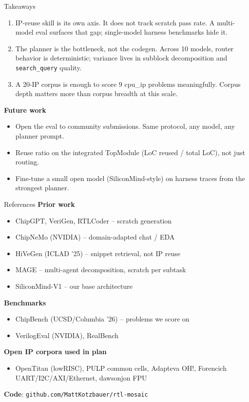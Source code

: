 \documentclass[10pt]{beamer}
\newcommand{\blue}[1]{\textcolor{accent}{#1}}
\begin{document}
\begin{frame}{Takeaways}
  \begin{enumerate}
    \item \blue{IP-reuse skill is its own axis.} It does not track scratch pass rate. A multi-model eval surfaces that gap; single-model harness benchmarks hide it.
    \item \blue{The planner is the bottleneck, not the codegen.} Across 10 models, router behavior is deterministic; variance lives in subblock decomposition and \texttt{search\_query} quality.
    \item \blue{A 20-IP corpus is enough to score 9 cpu\_ip problems meaningfully.} Corpus depth matters more than corpus breadth at this scale.
  \end{enumerate}

  \vspace{0.6em}
  \textbf{Future work}
  \begin{itemize}
    \item Open the eval to community submissions. Same protocol, any model, any planner prompt.
    \item Reuse ratio on the integrated TopModule (LoC reused / total LoC), not just routing.
    \item Fine-tune a small open model (SiliconMind-style) on harness traces from the strongest planner.
  \end{itemize}
\end{frame}

\begin{frame}{References}
  \footnotesize
  \textbf{Prior work}
  \begin{itemize}
    \item ChipGPT, VeriGen, RTLCoder -- scratch generation
    \item ChipNeMo (NVIDIA) -- domain-adapted chat / EDA
    \item HiVeGen (ICLAD '25) -- snippet retrieval, not IP reuse
    \item MAGE -- multi-agent decomposition, scratch per subtask
    \item SiliconMind-V1 -- our base architecture
  \end{itemize}

  \textbf{Benchmarks}
  \begin{itemize}
    \item ChipBench (UCSD/Columbia '26) -- problems we score on
    \item VerilogEval (NVIDIA), RealBench
  \end{itemize}

  \textbf{Open IP corpora used in plan}
  \begin{itemize}
    \item OpenTitan (lowRISC), PULP common cells, Adapteva OH!, Forencich UART/I2C/AXI/Ethernet, dawsonjon FPU
  \end{itemize}

  \vspace{0.5em}
  \textbf{Code}: \texttt{github.com/MattKotzbauer/rtl-mosaic}
\end{frame}
\end{document}
